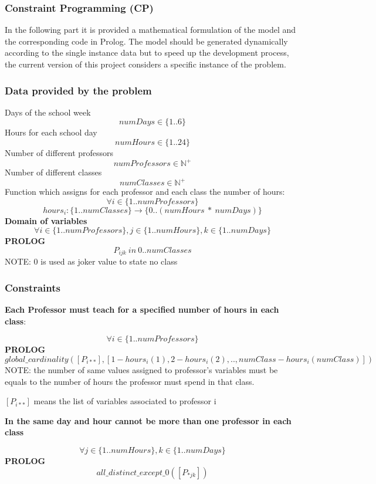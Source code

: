 \subsubsection{Constraint Programming (CP)}\label{subsubsec:case_cp}
In the following part it is provided a mathematical formulation of the model and the corresponding code in Prolog.
The model should be generated dynamically according to the single instance data but to speed up the development process, the current version of this project considers a specific instance of the problem.

\subsubsection{Data provided by the problem}\label{subsubsec:data_problem}
Days of the school week
\[numDays \in \{1..6\} \]
Hours for each school day
\[numHours \in \{1..24\} \]
Number of different professors
\[numProfessors \in \mathbb{N}^+ \]
Number of different classes
\[numClasses \in \mathbb{N}^+ \]
Function which assigns for each professor and each class the number of hours:
\[\forall i \in \{ 1..numProfessors \}\] 
\[ hours_i: \{ 1..numClasses \} \rightarrow \{0..(numHours\:*\:numDays)\} \]
\textbf{Domain of variables}
\[ \forall i \in \{1..numProfessors\}, j \in \{1..numHours\}, k \in \{1..numDays\} \] 
\textbf{PROLOG}
\[P_{ijk} \: in \: 0..numClasses\]
NOTE: 0 is used as joker value to state no class

\subsubsection{Constraints}

\textbf{Each Professor must teach for a specified number of hours in each class}:

\[\forall i \in \{1..numProfessors\}\]
\textbf{PROLOG}
\[ global\_cardinality([P_{i**}],[1-hours_i(1),2-hours_i(2),..,numClass-hours_i(numClass)])\]
NOTE: the number of same values assigned to professor's variables must be equals to the number of hours the professor must spend in that class.

\([P_{i**}]\) means the list of variables associated to professor i
\newline

\textbf{In the same day and hour cannot be more than one professor in each class}

\[\forall j \in \{1..numHours\}, k \in \{1..numDays\}\]
\textbf{PROLOG}
\[all\_distinct\_except\_0([P_{*jk}])\]

